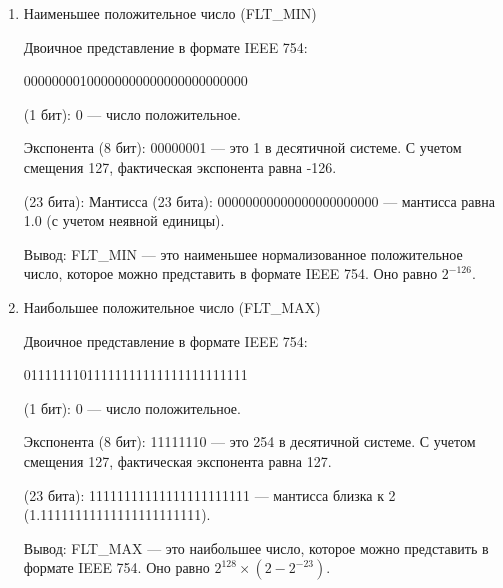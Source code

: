 \documentclass{report}
\begin{document}
\begin{enumerate}
		\begin{itemize}
			 (1 бит): 0 — не имеет значения для NaN.
			
			 (8 бит): 11111111 — все биты экспоненты равны 1, что указывает на специальное значение.
			
			 (23 бита): 10000000000000000000000 — хотя бы один бит мантиссы не равен нулю, что указывает на NaN.
		\end{itemize}
		
		\item{Наименьшее положительное число (FLT\_MIN)}
		
		Двоичное представление в формате IEEE 754:
		\begin{center}
			00000000100000000000000000000000
		\end{center}
		
		\begin{itemize}
			 (1 бит): 0 — число положительное.
			
			 Экспонента (8 бит): 00000001 — это 1 в десятичной системе. С учетом смещения 127, фактическая экспонента равна -126.
			
			 (23 бита): Мантисса (23 бита): 00000000000000000000000 — мантисса равна 1.0 (с учетом неявной единицы).
		\end{itemize}
		
		Вывод: FLT\_MIN — это наименьшее нормализованное положительное число, которое можно представить в формате IEEE 754. Оно равно $2^{-126}$.
		
		\item{Наибольшее положительное число (FLT\_MAX)}
		
		Двоичное представление в формате IEEE 754:
		\begin{center}
			01111111011111111111111111111111
		\end{center}
		
		\begin{itemize}
			 (1 бит): 0 — число положительное.
			
			 Экспонента (8 бит): 11111110 — это 254 в десятичной системе. С учетом смещения 127, фактическая экспонента равна 127.
			
			 (23 бита): 11111111111111111111111 — мантисса близка к 2 (1.11111111111111111111111).
		\end{itemize}
	
		Вывод: FLT\_MAX — это наибольшее число, которое можно представить в формате IEEE 754. Оно равно $2^{128} × (2-2^{-23}).$
		

\end{enumerate}
\end{document}
